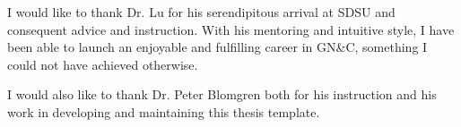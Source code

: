 \documentclass{sdsu-thesis}
\theoremstyle{dtm}
\begin{document}
\begin{glossarypage}
  \glsaddall\printglossary[title=]
\end{glossarypage}


\begin{acknowledgments}
I would like to thank Dr. Lu for his serendipitous arrival at SDSU and consequent 
advice and instruction. With his mentoring and intuitive style, I have been able to launch an enjoyable 
and fulfilling career in GN\&C, something I could not have achieved otherwise. 

I would also like to thank Dr. Peter Blomgren both for his instruction and his work in developing and maintaining this thesis template.

%
\end{acknowledgments}

%
%


% 
% 


% 
% 
% 




\end{document}
